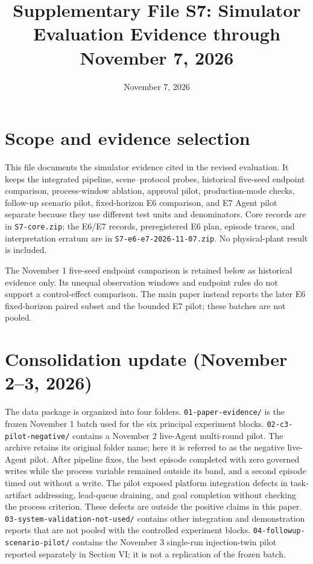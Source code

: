 \documentclass[10pt]{article}
\title{Supplementary File S7: Simulator Evaluation Evidence through November 7, 2026}
\author{}
\date{November 7, 2026}
\begin{document}
\maketitle

\section*{Scope and evidence selection}
This file documents the simulator evidence cited in the revised evaluation. It keeps the integrated pipeline, scene--protocol probes, historical five-seed endpoint comparison, process-window ablation, approval pilot, production-mode checks, follow-up scenario pilot, fixed-horizon E6 comparison, and E7 Agent pilot separate because they use different test units and denominators. Core records are in \texttt{S7-core.zip}; the E6/E7 records, preregistered E6 plan, episode traces, and interpretation erratum are in \texttt{S7-e6-e7-2026-11-07.zip}. No physical-plant result is included.

The November 1 five-seed endpoint comparison is retained below as historical evidence only. Its unequal observation windows and endpoint rules do not support a control-effect comparison. The main paper instead reports the later E6 fixed-horizon paired subset and the bounded E7 pilot; these batches are not pooled.

\section*{Consolidation update (November 2--3, 2026)}
The data package is organized into four folders. \texttt{01-paper-evidence/} is the frozen November 1 batch used for the six principal experiment blocks. \texttt{02-c3-pilot-negative/} contains a November 2 live-Agent multi-round pilot. The archive retains its original folder name; here it is referred to as the negative live-Agent pilot. After pipeline fixes, the best episode completed with zero governed writes while the process variable remained outside its band, and a second episode timed out without a write. The pilot exposed platform integration defects in task-artifact addressing, lead-queue draining, and goal completion without checking the process criterion. These defects are outside the positive claims in this paper. \texttt{03-system-validation-not-used/} contains other integration and demonstration reports that are not pooled with the controlled experiment blocks. \texttt{04-followup-scenario-pilot/} contains the November 3 single-run injection-twin pilot reported separately in Section VI; it is not a replication of the frozen batch.
\end{document}
